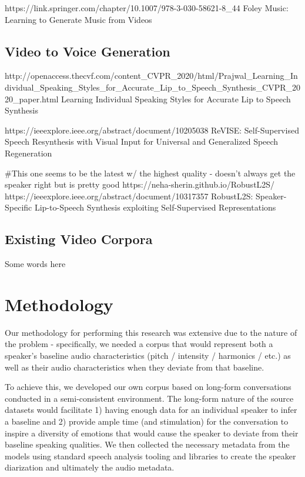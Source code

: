 \documentclass[10pt,twocolumn,letterpaper]{article}
\begin{document}
https://link.springer.com/chapter/10.1007/978-3-030-58621-8_44
Foley Music: Learning to Generate Music from Videos

\subsection{Video to Voice Generation}

http://openaccess.thecvf.com/content_CVPR_2020/html/Prajwal_Learning_Individual_Speaking_Styles_for_Accurate_Lip_to_Speech_Synthesis_CVPR_2020_paper.html
Learning Individual Speaking Styles for Accurate Lip to Speech Synthesis 

https://ieeexplore.ieee.org/abstract/document/10205038
ReVISE: Self-Supervised Speech Resynthesis with Visual Input for Universal and Generalized Speech Regeneration

#This one seems to be the latest w/ the highest quality - doesn't always get the speaker right but is pretty good
https://neha-sherin.github.io/RobustL2S/
https://ieeexplore.ieee.org/abstract/document/10317357
RobustL2S: Speaker-Specific Lip-to-Speech Synthesis exploiting Self-Supervised Representations

\subsection{Existing Video Corpora}

Some words here

\section{Methodology}
\label{sec:methodology}

Our methodology for performing this research was extensive due to the nature of the problem - specifically, we needed a corpus that would represent both a speaker's baseline audio characteristics (pitch / intensity / harmonics / etc.) as well as their audio characteristics when they deviate from that baseline. 

To achieve this, we developed our own corpus based on long-form conversations conducted in a semi-consistent environment. The long-form nature of the source datasets would facilitate 1) having enough data for an individual speaker to infer a baseline and 2) provide ample time (and stimulation) for the conversation to inspire a diversity of emotions that would cause the speaker to deviate from their baseline speaking qualities. We then collected the necessary metadata from the models using standard speech analysis tooling and libraries to create the speaker diarization and ultimately the audio metadata. 
\end{document}
